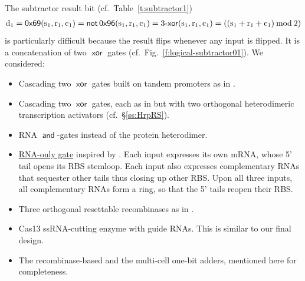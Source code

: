 \documentclass[12pt,notitlepage]{article}
\let\cite\citep
\newcommand{\NOT}{\ensuremath{\mathop{\mathsf{not}}}\xspace}
\newcommand{\AND}{\ensuremath{\mathop{\mathsf{and}}}\xspace}
\newcommand{\XOR}{\ensuremath{\mathop{\mathsf{xor}}}\xspace}
\newcommand{\with}{\text{$\,{:}\,$}}
\begin{document}
The subtractor result bit
(cf.~Table~\ref{t:subtractor1})
\begin{align} \label{e:3xor}
	\ce{d_1} 
	= 
	\mathop{\mathsf{0x69}}
	(\ce{s_1}, \ce{r_1}, \ce{c_1})
	=
	\NOT
	\mathop{\mathsf{0x96}}
	(\ce{s_1}, \ce{r_1}, \ce{c_1})
	=
	\text{3-\XOR}
	(\ce{s_1}, \ce{r_1}, \ce{c_1})
	=
	((\ce{s_1} + \ce{r_1} + \ce{c_1}) \mathbin{\mathrm{mod}} 2)
\end{align}
is particularly difficult
because the result flips 
whenever any input is flipped.
%
%
It is a concatenation
of two \XOR gates (cf.~Fig.~\ref{f:logical-subtractor01}).
%
%
%
We considered:
%
\begin{itemize}
\item
	Cascading 
	two \XOR gates
	built on tandem promoters as in
	\cite[\href{https://science.sciencemag.org/content/sci/352/6281/aac7341/F4.large.jpg}{Fig.~3}]{NielsenETAL2016}.
\item
	Cascading
	two \XOR gates, 
	each as in 
	\cite[\href{https://bmcbiol.biomedcentral.com/articles/10.1186/s12915-015-0146-0/figures/5}{Fig.~5}]{Wong2015}
	but
	with two orthogonal heterodimeric transcription activators
	(cf.~\S\ref{ss:HrpRS}).
\item
	RNA \AND-gates
	\cite[\href{https://www.nature.com/articles/nature23271/figures/2}{Fig.~2e}]{GreenETAL2017}
	instead of the protein heterodimer.
\item
	\href{https://bit.ly/wsgxfDv}{RNA-only gate}
	inspired by
	\cite[\href{https://www.nature.com/articles/nature23271/figures/2}{Fig.~2e}]{GreenETAL2017}.
	Each input expresses its own mRNA,
	whose
	5' tail opens its RBS stemloop.
	Each input also expresses
	complementary RNAs
	that
	sequester other tails 
	thus closing up other RBS.
	Upon all three inputs,
	all complementary RNAs 
	form a ring,
	so that the 5' tails reopen their RBS.
\item
	Three orthogonal resettable recombinases
	as in 
	\cite[\href{https://www.nature.com/articles/s41598-017-07386-3/figures/2}{Fig.~2g}]{ChiuJiang2017}.
\item
    Cas13 ssRNA-cutting enzyme with guide RNAs.
    This is similar to our final design.
\item
    The recombinase-based
    \citep{WeinbergETAL2017}
    and
    the multi-cell
    \citep{AuslaenderETAL2017}
    one-bit adders,
    mentioned here for completeness.
\end{itemize}
\end{document}

